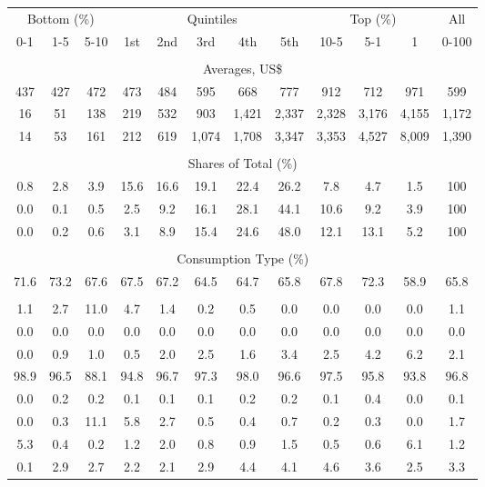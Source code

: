 \begin{tabular}{c c c| c c c c c| c c c| c}
\toprule
\multicolumn{3}{c|}{Bottom (\%)} & \multicolumn{5}{c|}{Quintiles} & \multicolumn{3}{c|}{Top (\%)} & All  \\
0-1 & 1-5 & 5-10 &  1st & 2nd & 3rd & 4th & 5th & 10-5 & 5-1 & 1 & 0-100 \\
\midrule \\
\multicolumn{12}{c}{Averages, US\$} \\
\midrule
437  & 427  & 472  & 473  & 484  & 595  & 668  & 777  & 912  & 712  & 971  & 599 \\
16 & 51 & 138 & 219 & 532 & 903 & 1,421 & 2,337 & 2,328 & 3,176 & 4,155 & 1,172 \\
14 & 53 & 161 & 212 & 619 & 1,074 & 1,708 & 3,347 & 3,353 & 4,527 & 8,009 & 1,390 \\
\midrule \\
\multicolumn{12}{c}{Shares of Total (\%)} \\
\midrule
0.8   & 2.8   & 3.9   & 15.6   & 16.6   & 19.1   & 22.4   & 26.2   & 7.8   & 4.7   & 1.5   & 100 \\
0.0  & 0.1  & 0.5  & 2.5  & 9.2  & 16.1  & 28.1  & 44.1  & 10.6  & 9.2  & 3.9  & 100 \\
0.0  & 0.2  & 0.6  & 3.1  & 8.9  & 15.4  & 24.6  & 48.0  & 12.1  & 13.1  & 5.2  & 100 \\
\midrule \\
\multicolumn{12}{c}{Consumption Type (\%)}  \\
\midrule
71.6 & 73.2 & 67.6 & 67.5 & 67.2 & 64.5 & 64.7 & 65.8 & 67.8 & 72.3 & 58.9 & 65.8 \\
 & & & & & & & & & & &  \\
1.1 & 2.7 & 11.0 & 4.7 & 1.4 & 0.2 & 0.5 & 0.0 & 0.0 & 0.0 & 0.0 & 1.1 \\
0.0 & 0.0 & 0.0 & 0.0 & 0.0 & 0.0 & 0.0 & 0.0 & 0.0 & 0.0 & 0.0 & 0.0 \\
0.0 & 0.9 & 1.0 & 0.5 & 2.0 & 2.5 & 1.6 & 3.4 & 2.5 & 4.2 & 6.2 & 2.1 \\
98.9 & 96.5 & 88.1 & 94.8 & 96.7 & 97.3 & 98.0 & 96.6 & 97.5 & 95.8 & 93.8 & 96.8 \\
0.0 & 0.2 & 0.2 & 0.1 & 0.1 & 0.1 & 0.2 & 0.2 & 0.1 & 0.4 & 0.0 & 0.1 \\
0.0 & 0.3 & 11.1 & 5.8 & 2.7 & 0.5 & 0.4 & 0.7 & 0.2 & 0.3 & 0.0 & 1.7 \\
5.3 & 0.4 & 0.2 & 1.2 & 2.0 & 0.8 & 0.9 & 1.5 & 0.5 & 0.6 & 6.1 & 1.2 \\
0.1 & 2.9 & 2.7 & 2.2 & 2.1 & 2.9 & 4.4 & 4.1 & 4.6 & 3.6 & 2.5 & 3.3 \\

\end{tabular}
